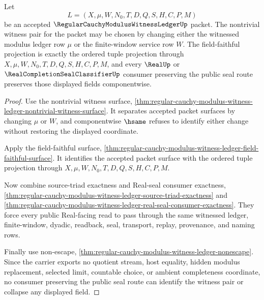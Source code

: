 \begin{theorem}
\label{thm:regular-cauchy-modulus-witness-ledger-tastegate-field-projection}
Let
$$
L=(X,\mu,W,N_0,T,D,Q,S,H,C,P,M)
$$
be an accepted $\RegularCauchyModulusWitnessLedgerUp$ packet. The nontrivial witness pair for the packet may be chosen by changing either the witnessed modulus ledger row $\mu$ or the finite-window service row $W$. The field-faithful projection is exactly the ordered tuple projection through $X,\mu,W,N_0,T,D,Q,S,H,C,P,M$, and every $\RealUp$ or $\RealCompletionSealClassifierUp$ consumer preserving the public seal route preserves those displayed fields componentwise.
\end{theorem}
\begin{proof}
Use the nontrivial witness surface, \autoref{thm:regular-cauchy-modulus-witness-ledger-nontrivial-witness-surface}. It separates accepted packet surfaces by changing $\mu$ or $W$, and componentwise $\hsame$ refuses to identify either change without restoring the displayed coordinate.

Apply the field-faithful surface, \autoref{thm:regular-cauchy-modulus-witness-ledger-field-faithful-surface}. It identifies the accepted packet surface with the ordered tuple projection through $X,\mu,W,N_0,T,D,Q,S,H,C,P,M$.

Now combine source-triad exactness and Real-seal consumer exactness, \autoref{thm:regular-cauchy-modulus-witness-ledger-source-triad-exactness} and \autoref{thm:regular-cauchy-modulus-witness-ledger-real-seal-consumer-exactness}. They force every public Real-facing read to pass through the same witnessed ledger, finite-window, dyadic, readback, seal, transport, replay, provenance, and naming rows.

Finally use non-escape, \autoref{thm:regular-cauchy-modulus-witness-ledger-nonescape}. Since the carrier exports no quotient stream, host equality, hidden modulus replacement, selected limit, countable choice, or ambient completeness coordinate, no consumer preserving the public seal route can identify the witness pair or collapse any displayed field.
\end{proof}

